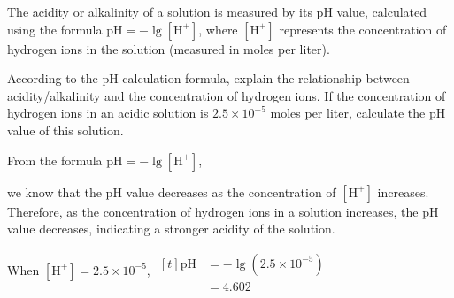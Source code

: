 \documentclass{report}
\begin{document}
			\begin{question}
				The acidity or alkalinity of a solution is measured by its $\mathrm{pH}$ value, calculated using the formula $\mathrm{pH}=-\lg \left[\mathrm{H}^{+}\right]$, where $\left[\mathrm{H}^{+}\right]$ represents the concentration of hydrogen ions in the solution (measured in moles per liter).
				\begin{tasks}[label=(\alph*)]
					\task According to the $\mathrm{pH}$ calculation formula, explain the relationship between acidity/alkalinity and the concentration of hydrogen ions.
					\task If the concentration of hydrogen ions in an acidic solution is $2.5 \times 10^{-5}$ moles per liter, calculate the $\mathrm{pH}$ value of this solution.
				\end{tasks}
				
				\sol{}
				\begin{tasks}[label=(\alph*)]
					\task From the formula $\mathrm{pH}=-\lg \left[\mathrm{H}^{+}\right]$, 
					                
					we know that the $\mathrm{pH}$ value decreases as the concentration of $\left[\mathrm{H}^{+}\right]$ increases. Therefore, as the concentration of hydrogen ions in a solution increases, the $\mathrm{pH}$ value decreases, indicating a stronger acidity of the solution.
					
					\task When $\left[\mathrm{H}^{+}\right]=2.5 \times 10^{-5}$, $\begin{aligned}[t]
					\mathrm{pH} & =-\lg \left(2.5 \times 10^{-5}\right) \\
					& =4.602
					\end{aligned}$
				\end{tasks}
			\end{question}
			
\end{document}
